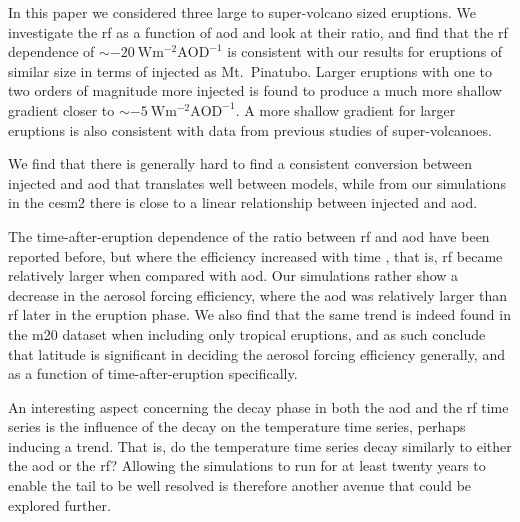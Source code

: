\documentclass{ametsocV6.1}
\newcommand{\iso}[1][i]{{#1}njected \ce{SO2}}
\begin{document}
In this paper we considered three large to super-volcano sized eruptions. We investigate
the \gls{rf} as a function of \gls{aod} and look at their ratio, and find that the
\gls{rf} dependence of \(\sim\SI{-20}{\watt\metre^{-2}\mathrm{AOD}^{-1}}\) is consistent
with our results for eruptions of similar size in terms of \iso{} as Mt.\ Pinatubo.
Larger eruptions with one to two orders of magnitude more \iso{} is found to produce a
much more shallow gradient closer to \(\sim
\SI{-5}{\watt\metre^{-2}\mathrm{AOD}^{-1}}\). A more shallow gradient for larger
eruptions is also consistent with data from previous studies of super-volcanoes.

We find that there is generally hard to find a consistent conversion between \iso{} and
\gls{aod} that translates well between models, while from our simulations in the
\gls{cesm2} there is close to a linear relationship between \iso{} and \gls{aod}.

The time-after-eruption dependence of the ratio between \gls{rf} and \gls{aod} have been
reported before, but where the efficiency increased with time \citep{marshall2020}, that
is, \gls{rf} became relatively larger when compared with \gls{aod}. Our simulations
rather show a decrease in the aerosol forcing efficiency, where the \gls{aod} was
relatively larger than \gls{rf} later in the eruption phase. We also find that the same
trend is indeed found in the \gls{m20} dataset when including only tropical eruptions,
and as such conclude that latitude is significant in deciding the aerosol forcing
efficiency generally, and as a function of time-after-eruption specifically.

An interesting aspect concerning the decay phase in both the \gls{aod} and the \gls{rf}
time series is the influence of the decay on the temperature time series, perhaps
inducing a trend. That is, do the temperature time series decay similarly to either the
\gls{aod} or the \gls{rf}? Allowing the simulations to run for at least twenty years to
enable the tail to be well resolved is therefore another avenue that could be explored
further.

\clearpage
\acknowledgments{}
\end{document}
